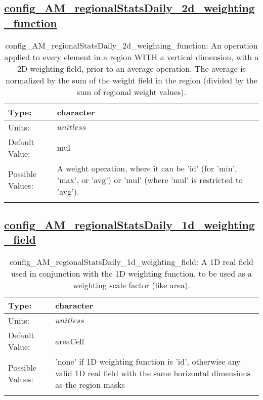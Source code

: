 \subsection[config\_AM\_regionalStatsDaily\_2d\_weighting\_function]{\hyperref[sec:nm_tab_AM_regionalStatsDaily]{config\_AM\_regionalStatsDaily\_2d\_weighting\_function}}
\label{subsec:nm_sec_config_AM_regionalStatsDaily_2d_weighting_function}
\begin{center}
\begin{longtable}{| p{2.0in} || p{4.0in} |}
    \hline
    Type: & character \\
    \hline
    Units: & $unitless$ \\
    \hline
    Default Value: & mul \\
    \hline
    Possible Values: & A weight operation, where it can be 'id' (for 'min', 'max', or 'avg') or 'mul' (where 'mul' is restricted to 'avg'). \\
    \hline
    \caption{config\_AM\_regionalStatsDaily\_2d\_weighting\_function: An operation applied to every element in a region WITH a vertical dimension, with a 2D weighting field, prior to an average operation. The average is normalized by the sum of the weight field in the region (divided by the sum of regional weight values).}
\end{longtable}
\end{center}
\subsection[config\_AM\_regionalStatsDaily\_1d\_weighting\_field]{\hyperref[sec:nm_tab_AM_regionalStatsDaily]{config\_AM\_regionalStatsDaily\_1d\_weighting\_field}}
\label{subsec:nm_sec_config_AM_regionalStatsDaily_1d_weighting_field}
\begin{center}
\begin{longtable}{| p{2.0in} || p{4.0in} |}
    \hline
    Type: & character \\
    \hline
    Units: & $unitless$ \\
    \hline
    Default Value: & areaCell \\
    \hline
    Possible Values: & 'none' if 1D weighting function is 'id', otherwise any valid 1D real field with the same horizontal dimensions as the region masks \\
    \hline
    \caption{config\_AM\_regionalStatsDaily\_1d\_weighting\_field: A 1D real field used in conjunction with the 1D weighting function, to be used as a weighting scale factor (like area).}
\end{longtable}
\end{center}
